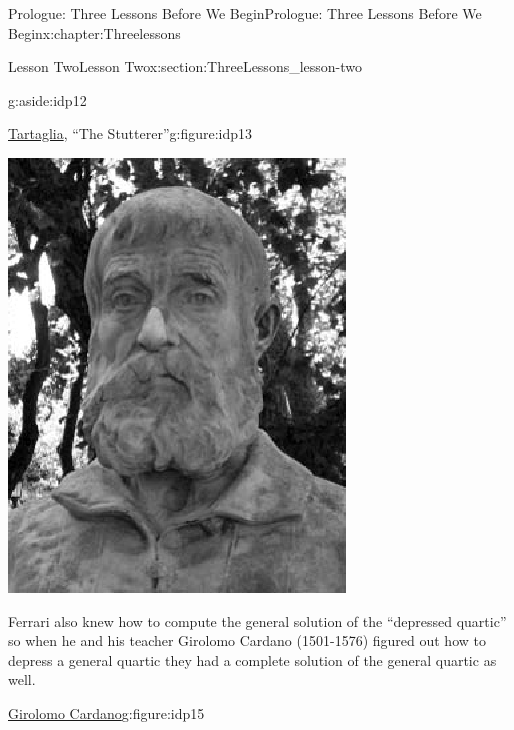 \begin{chapterptx}{Prologue: Three Lessons Before We Begin}{}{Prologue: Three Lessons Before We Begin}{}{}{x:chapter:Threelessons}
\begin{sectionptx}{Lesson Two}{}{Lesson Two}{}{}{x:section:ThreeLessons_lesson-two}
\begin{aside}{}{g:aside:idp12}
		\end{aside}
		\begin{figureptx}{\href{https://mathshistory.st-andrews.ac.uk/Biographies/Tartaglia/}{Tartaglia}\protect\footnotemark{}, ``The Stutterer''}{g:figure:idp13}{}%
			\begin{image}{0.36}{0.28}{0.36}%
				\includegraphics[width=\linewidth]{external/images/Tartaglia.png}
			\end{image}%
			\tcblower
		\end{figureptx}%
		Ferrari also knew how to compute the general solution of the ``depressed quartic'' so when he and his teacher Girolomo Cardano (1501-1576) figured out how to depress a general quartic they had a complete solution of the general quartic as well. \begin{figureptx}{\href{https://mathshistory.st-andrews.ac.uk/Biographies/Cardan}{Girolomo Cardano}\protect\footnotemark{}}{g:figure:idp15}{}%

\end{figureptx}
\end{sectionptx}
\end{chapterptx}
